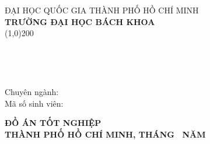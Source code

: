 \thispagestyle{empty}



\begin{center}
    \vspace{-12pt} ĐẠI HỌC QUỐC GIA THÀNH PHỐ HỒ CHÍ MINH\\
    \textbf{TRƯỜNG ĐẠI HỌC BÁCH KHOA}\\
    \vspace{-0.6 cm}
    \line (1,0){200} 

    \vspace{60pt}
    \fontsize{14pt}{0pt}
    \selectfont \SVupper \\

    \vspace{60pt}

    \begin{adjustwidth}{0.5cm}{0.5cm}
        \begin{center}
                 \textbf{
                 \fontsize{18pt}{0pt} 
                 \selectfont 
                 \titlevn}\\
        \end{center}
     \end{adjustwidth}
\end{center}

\vspace{4cm}
\begin{flushleft}
    \hspace{1.5cm} Chuyên ngành: \major \\ 
    \hspace{1.5cm} Mã số sinh viên: \MSSV \\ 
\end{flushleft}

\begin{center}
    \vspace{2.5cm}
    \fontsize{15pt}{0pt}\textbf{ĐỒ ÁN TỐT NGHIỆP}\\
    \vspace{4cm}
    \fontsize{13pt}{0pt}\textbf{
    THÀNH PHỐ HỒ CHÍ MINH, THÁNG \month \ NĂM \year} 
\end{center}

    